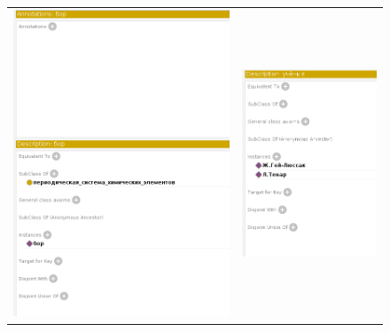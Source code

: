 \documentclass[a4paper]{article}
\begin{document}
\begin{landscape}
\begin{figure}
\begin{tabular}{cc}
  \includegraphics[scale=0.75]{./Source/protege/class_bor.png}
  &
  \includegraphics[scale=1.0]{./Source/protege/scientists.png}

\end{tabular}
\end{figure}
\end{landscape}
\end{document}
